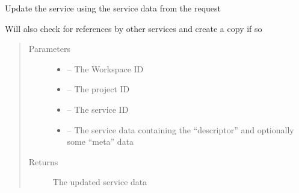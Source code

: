 \documentclass[letterpaper,10pt,english]{sphinxmanual}
\begin{document}
\begin{fulllineitems}
\label{_source/son_editor.impl:son_editor.impl.servicesimpl.update_service}
Update the service using the service data from the request

Will also check for references by other services and create a copy if so
\begin{quote}\begin{description}
\item[{Parameters}] \leavevmode\begin{itemize}
\item {} 
 -- The Workspace ID

\item {} 
 -- The project ID

\item {} 
 -- The service ID

\item {} 
 -- The service data containing the ``descriptor'' and optionally some ``meta'' data

\end{itemize}

\item[{Returns}] \leavevmode
The updated service data

\end{description}\end{quote}

\end{fulllineitems}

\end{document}
